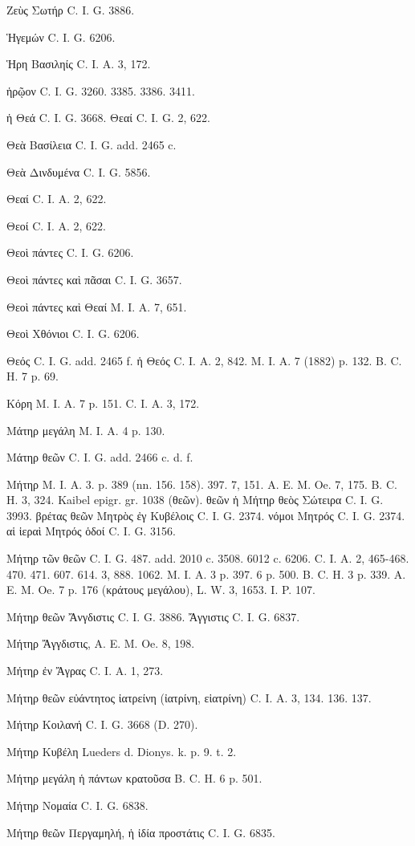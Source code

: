 \documentclass[a4paper, 11pt, oneside, polutonikogreek, german]{article}
\begin{document}
Ζεὺς Σωτήρ C. I. G. 3886.

Ἡγεμών C. I. G. 6206.

Ἡρη Βασιληίς C. I. A. 3, 172.

ἡρῷον C. I. G. 3260. 3385. 3386. 3411.

ἡ Θεά C. I. G. 3668. Θεαί C. I. G. 2, 622.

Θεὰ Βασίλεια C. I. G. add. 2465 c.

Θεὰ Δινδυμένα C. I. G. 5856.

Θεαί C. I. A. 2, 622.

Θεοί C. I. A. 2, 622.

Θεοὶ πάντες C. I. G. 6206.

Θεοὶ πάντες καὶ πᾶσαι C. I. G. 3657.

Θεοὶ πάντες καὶ Θεαί M. I. A. 7, 651.

Θεοὶ Χθόνιοι C. I. G. 6206.

Θεός C. I. G. add. 2465 f. ἡ Θεός C. I. A. 2, 842. M. I. A. 7 (1882) p. 132. B. C. H. 7 p. 69.

Κόρη M. I. A. 7 p. 151. C. I. A. 3, 172.

Μάτηρ μεγάλη M. I. A. 4 p. 130.

Μάτηρ θεῶν C. I. G. add. 2466 c. d. f.

Μήτηρ M. I. A. 3. p. 389 (nn. 156. 158). 397. 7, 151. A. E. M. Oe. 7, 175. B. C. H. 3, 324. Kaibel epigr. gr. 1038 (θεῶν). θεῶν ἡ Μήτηρ θεὸς Σώτειρα C. I. G. 3993. βρέτας θεῶν Μητρὸς ἐγ Κυβέλοις C. I. G. 2374. νόμοι Μητρός C. I. G. 2374. αἱ ἱεραὶ Μητρός ὁδοί C. I. G. 3156.

Μήτηρ τῶν θεῶν C. I. G. 487. add. 2010 c. 3508. 6012 c. 6206. C. I. A. 2, 
465-468. 470. 471. 607. 614. 3, 888. 1062. M. I. A. 3 p. 397. 6 p. 500. B. C. H. 3 p. 339. A. E. M. Oe. 7 p. 176 (κράτους μεγάλου), L. W. 3, 1653. I. P. 107.

Μήτηρ θεῶν Ἄνγδιστις C. I. G. 3886. Ἄγγιστις C. I. G. 6837.

Μήτηρ Ἄγγδιστις, A. E. M. Oe. 8, 198.

Μήτηρ ἐν Ἄγρας C. I. A. 1, 273.

Μήτηρ θεῶν εὐάντητος ἰατρείνη (ἰατρίνη, εἱατρίνη) C. I. A. 3, 134. 136. 137.

Μήτηρ Κοιλανή C. I. G. 3668 (D. 270).

Μήτηρ Κυβέλη Lueders d. Dionys. k. p. 9. t. 2.

Μήτηρ μεγάλη ἡ πάντων κρατοῦσα B. C. H. 6 p. 501.

Μήτηρ Νομαία C. I. G. 6838.

Μήτηρ θεῶν Περγαμηλή, ἡ ἰδία προστάτις C. I. G. 6835.
\end{document}
